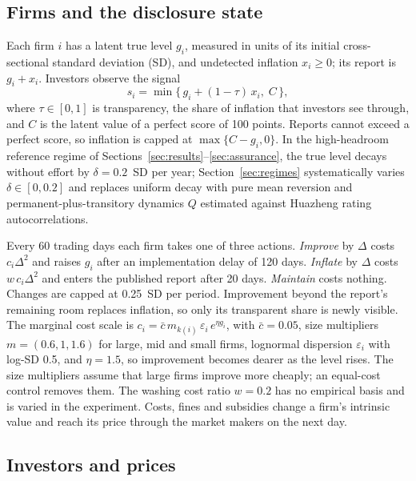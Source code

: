 \documentclass[11pt]{article}
\begin{document}
\subsection{Firms and the disclosure state}

Each firm $i$ has a latent true level $g_i$, measured in units of its initial cross-sectional standard deviation (SD), and undetected inflation $x_i \ge 0$; its report is $g_i + x_i$. Investors observe the signal
\begin{equation}
s_i = \min\{\, g_i + (1-\tau)\,x_i,\; C \,\},
\label{eq:signal}
\end{equation}
where $\tau \in [0,1]$ is transparency, the share of inflation that investors see through, and $C$ is the latent value of a perfect score of 100 points. Reports cannot exceed a perfect score, so inflation is capped at $\max\{C - g_i, 0\}$. In the high-headroom reference regime of Sections~\ref{sec:results}--\ref{sec:assurance}, the true level decays without effort by $\delta = 0.2$~SD per year; Section~\ref{sec:regimes} systematically varies $\delta \in [0, 0.2]$ and replaces uniform decay with pure mean reversion and permanent-plus-transitory dynamics $Q$ estimated against Huazheng rating autocorrelations.

Every 60 trading days each firm takes one of three actions. \emph{Improve} by $\Delta$ costs $c_i\Delta^2$ and raises $g_i$ after an implementation delay of 120 days. \emph{Inflate} by $\Delta$ costs $w\,c_i\Delta^2$ and enters the published report after 20 days. \emph{Maintain} costs nothing. Changes are capped at 0.25~SD per period. Improvement beyond the report's remaining room replaces inflation, so only its transparent share is newly visible. The marginal cost scale is $c_i = \bar c\, m_{k(i)}\, \varepsilon_i\, e^{\eta g_i}$, with $\bar c = 0.05$, size multipliers $m = (0.6, 1, 1.6)$ for large, mid and small firms, lognormal dispersion $\varepsilon_i$ with log-SD 0.5, and $\eta = 1.5$, so improvement becomes dearer as the level rises. The size multipliers assume that large firms improve more cheaply; an equal-cost control removes them. The washing cost ratio $w = 0.2$ has no empirical basis and is varied in the experiment. Costs, fines and subsidies change a firm's intrinsic value and reach its price through the market makers on the next day.

\subsection{Investors and prices}\label{sec:market}
\end{document}
